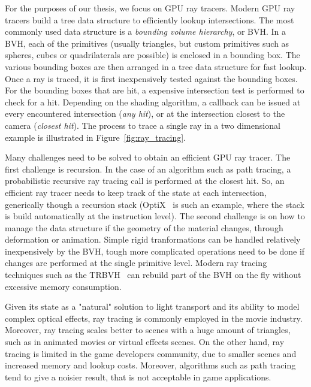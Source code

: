 For the purposes of our thesis, we focus on GPU ray tracers. Modern GPU ray tracers build a tree data structure to efficiently lookup intersections. The most commonly used data structure is a \emph{bounding volume hierarchy}, or BVH. In a BVH, each of the primitives (usually triangles, but custom primitives such as spheres, cubes or quadrilaterals are possible) is enclosed in a bounding box. The various bounding boxes are then arranged in a tree data structure for fast lookup. Once a ray is traced, it is first inexpensively tested against the bounding boxes. For the bounding boxes that are hit, a expensive intersection test is performed to check for a hit. Depending on the shading algorithm, a callback can be issued at every encountered intersection (\emph{any hit}), or at the intersection closest to the camera (\emph{closest hit}). The process to trace a single ray in a two dimensional example is illustrated in Figure~\ref{fig:ray_tracing}. 

Many challenges need to be solved to obtain an efficient GPU ray tracer. The first challenge is recursion. In the case of an algorithm such as path tracing, a probabilistic recursive ray tracing call is performed at the closest hit. So, an efficient ray tracer needs to keep track of the state at each intersection, generically though a recursion stack (OptiX~\cite{Parker2010} is such an example, where the stack is build automatically at the instruction level). The second challenge is on how to manage the data structure if the geometry of the material changes, through deformation or animation. Simple rigid tranformations can be handled relatively inexpensively by the BVH, tough more complicated operations need to be done if  changes are performed at the single primitive level. Modern ray tracing techniques such as the TRBVH~\cite{Karras2013} can rebuild part of the BVH on the fly without excessive memory consumption. 

Given its state as a "natural" solution to light transport and its ability to model complex optical effects, ray tracing is commonly employed in the movie industry. Moreover, ray tracing scales better to scenes with a huge amount of triangles, such as in animated movies or virtual effects scenes. On the other hand, ray tracing is limited in the game developers community, due to smaller scenes and increased memory and lookup costs. Moreover, algorithms such as path tracing tend to give a noisier result, that is not acceptable in game applications. 


